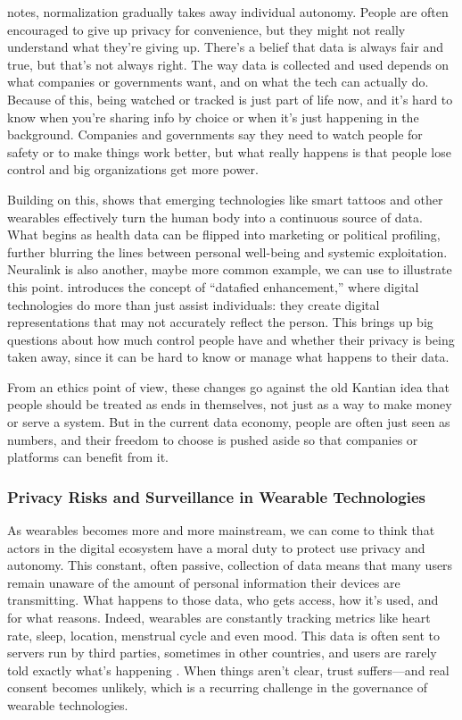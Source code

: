 	\cite{VanDijck2014} notes, normalization gradually takes away individual autonomy. People are often encouraged to give up privacy for convenience, but they might not really understand what they’re giving up. There’s a belief that data is always fair and true, but that’s not always right. The way data is collected and used depends on what companies or governments want, and on what the tech can actually do. Because of this, being watched or tracked is just part of life now, and it’s hard to know when you’re sharing info by choice or when it’s just happening in the background. Companies and governments say they need to watch people for safety or to make things work better, but what really happens is that people lose control and big organizations get more power.

	Building on this, \cite{deOliveira2022} shows that emerging technologies like smart tattoos and other wearables effectively turn the human body into a continuous source of data. 
	What begins as health data can be flipped into marketing or political profiling, further blurring the lines between personal well-being and systemic exploitation. Neuralink \cite{Musk2019} is also another, maybe more common example, we can use to illustrate this point.
	\cite{Liu2025} introduces the concept of “datafied enhancement,” where digital technologies do more than just assist individuals: they create digital representations that may not accurately reflect the person. This brings up big questions about how much control people have and whether their privacy is being taken away, since it can be hard to know or manage what happens to their data. 

	From an ethics point of view, these changes go against the old  Kantian idea that people should be treated as ends in themselves, not just as a way to make money or serve a system. But in the current data economy, people are often just seen as numbers, and their freedom to choose is pushed aside so that companies or platforms can benefit from it.
	\subsubsection{Privacy Risks and Surveillance in Wearable Technologies}

	As wearables becomes more and more mainstream, we can come to think that actors in the digital ecosystem have a moral duty to protect use privacy and autonomy. This constant, often passive, collection of data means that many users remain unaware of the amount of personal information their devices are transmitting. What happens to those data, who gets access, how it’s used, and for what reasons. Indeed, wearables are constantly tracking metrics like heart rate, sleep, location, menstrual cycle and even mood. This data is often sent to servers run by third parties, sometimes in other countries, and users are rarely told exactly what’s happening \cite{Sui2023}. When things aren’t clear, trust suffers—and real consent becomes unlikely, which is a recurring challenge in the governance of wearable technologies.

